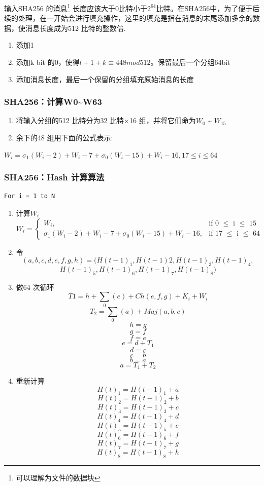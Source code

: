 \documentclass[hyperref,]{ctexart}
\begin{document}
输入SHA256 的消息\footnote{可以理解为文件的数据块}
长度应该大于0比特小于\(2^{64}\)比特。在SHA256中，为了便于后续的处理，在一开始会进行填充操作，这里的填充是指在消息的末尾添加多余的数据，使消息长度成为512
比特的整数倍.

\begin{enumerate}
\def\labelenumi{\arabic{enumi}.}
\item
  添加1
\item
  添加k bit 的0，使得\(l+1+k \equiv 448mod512\)。保留最后一个分组64bit
\item
  添加消息长度，最后一个保留的分组填充原始消息的长度
\end{enumerate}

\hypertarget{sha256w0w63}{%
\subsubsection{SHA256：计算W0\textasciitilde{}W63}\label{sha256w0w63}}

\begin{enumerate}
\def\labelenumi{\arabic{enumi}.}
\item
  将输入分组的512 比特分为32 比特×16 组，并将它们命为\(W_0\)
  \textasciitilde{} \(W_{15}\)
\item
  余下的48 组用下面的公式表示:
\end{enumerate}

\(W_i = \sigma_1(W_i - 2) +W_i - 7 + \sigma_0(W_i - 15) +W_i - 16, 17 \leq i \leq 64\)

\hypertarget{sha256hash-}{%
\subsubsection{SHA256：Hash 计算算法}\label{sha256hash-}}

\begin{verbatim}
For i = 1 to N
\end{verbatim}

\begin{enumerate}
\def\labelenumi{\arabic{enumi}.}
\item
  计算\(W_i\)\\
  \[W_i = \begin{cases} W_i, & \text {if 0 $\leq$ i $\leq$ 15} \\ \sigma_1(W_i - 2) +W_i - 7 + \sigma_0(W_i - 15) +W_i - 16,  & \text {if 17 $\leq$ i $\leq$ 64} \end{cases}\]
\item
  令
  \[(a, b, c, d, e, f, g, h) = (H(t - 1)_1,H(t - 1)2,H(t - 1)_3,H(t - 1)_4,\]
  \[H(t - 1)_5,H(t - 1)_6,H(t - 1)_7,H(t - 1)_8)\]
\item
  做64 次循环 \[T1 = h + \sum_ {0} (e) + Ch(e, f, g) + K_i +W_i\]
  \[T_2 = \sum_ {0} (a) +Maj(a, b, c)\] \[h = g\] \[g = f\] \[f = e\]
  \[e = d + T_1\] \[d = c\] \[c = b\] \[b = a\] \[a = T_1 + T_2\]
\item
  重新计算 \[H(t)_1 = H(t-1)_1 + a\] \[H(t)_2 = H(t-1)_2 + b\]
  \[H(t)_3 = H(t-1)_3 + c\] \[H(t)_4 = H(t-1)_4 + d\]
  \[H(t)_5 = H(t-1)_5 + e\] \[H(t)_6 = H(t-1)_6 + f\]
  \[H(t)_7 = H(t-1)_7 + g\] \[H(t)_8 = H(t-1)_8 + h\]
\end{enumerate}
\end{document}
